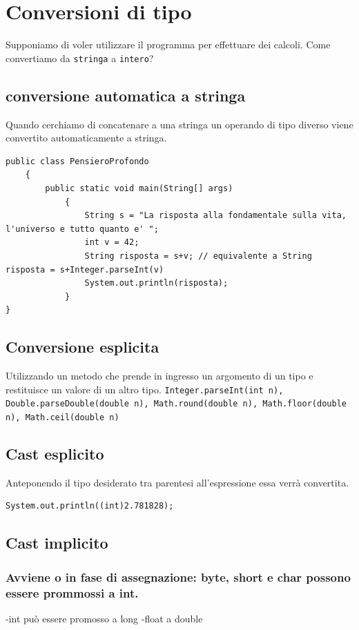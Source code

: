 \documentclass[11pt]{article}
\begin{document}
\section{Conversioni di tipo}
\label{sec:orgb04ae99}

Supponiamo di voler utilizzare il programma per effettuare dei calcoli. Come convertiamo da \texttt{stringa} a \texttt{intero}?
\subsection{conversione automatica a stringa}
\label{sec:org5eb016c}
Quando cerchiamo di concatenare a una stringa un operando di tipo diverso viene convertito automaticamente a stringa.

\begin{verbatim}
public class PensieroProfondo
    {
        public static void main(String[] args)
            {
                String s = "La risposta alla fondamentale sulla vita, l'universo e tutto quanto e' ";
                int v = 42;
                String risposta = s+v; // equivalente a String risposta = s+Integer.parseInt(v)
                System.out.println(risposta);
            }
}
\end{verbatim}
\subsection{Conversione esplicita}
\label{sec:orgf23f2e1}
Utilizzando un metodo che prende in ingresso un argomento di un tipo e restituisce un valore di un altro tipo.
\texttt{Integer.parseInt(int n), Double.parseDouble(double n), Math.round(double n),  Math.floor(double n), Math.ceil(double n)}
\subsection{Cast esplicito}
\label{sec:org4dc7f91}
Anteponendo il tipo desiderato tra parentesi all'espressione essa verrà convertita.
\begin{verbatim}
System.out.println((int)2.781828);
\end{verbatim}
\subsection{Cast implicito}
\label{sec:orgce3815f}
\subsubsection{Avviene o in fase di assegnazione: byte, short e char possono essere prommossi a int.}
\label{sec:orgc006094}
-int può essere promosso a long
-float a double
\end{document}
